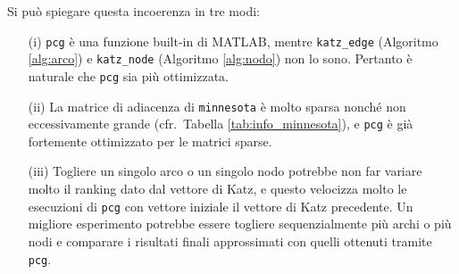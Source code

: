 \documentclass[a4paper]{article}
\begin{document}
	Si può spiegare questa incoerenza in tre modi:
	
	\begin{itemize}
		\item[(i)] \texttt{pcg} è una funzione built-in di MATLAB, mentre \texttt{katz\_edge} (Algoritmo \ref{alg:arco}) e
		\texttt{katz\_node} (Algoritmo \ref{alg:nodo}) non lo sono. Pertanto è naturale che \texttt{pcg} sia più ottimizzata.
		      
		\item[(ii)] La matrice di adiacenza di \texttt{minnesota} è molto sparsa nonché non eccessivamente grande (cfr.~Tabella \ref{tab:info_minnesota}),
		      e \texttt{pcg} è già fortemente ottimizzato per le matrici sparse.
		      
		\item[(iii)] Togliere un singolo arco o un singolo nodo potrebbe non far variare molto il ranking dato dal vettore
		      di Katz, e questo velocizza molto le esecuzioni di \texttt{pcg} con vettore iniziale il vettore di Katz precedente. Un migliore esperimento potrebbe essere togliere sequenzialmente più archi o più nodi e comparare i risultati
		      finali approssimati con quelli ottenuti tramite \texttt{pcg}.
	\end{itemize}
	
	\printbibliography
	
\end{document}
